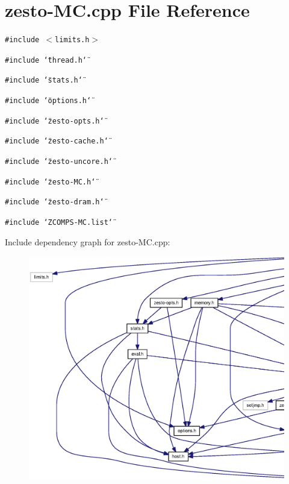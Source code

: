 \section{zesto-MC.cpp File Reference}
\label{zesto-MC_8cpp}
{\tt \#include $<$limits.h$>$}\par
{\tt \#include \char`\"{}thread.h\char`\"{}}\par
{\tt \#include \char`\"{}stats.h\char`\"{}}\par
{\tt \#include \char`\"{}options.h\char`\"{}}\par
{\tt \#include \char`\"{}zesto-opts.h\char`\"{}}\par
{\tt \#include \char`\"{}zesto-cache.h\char`\"{}}\par
{\tt \#include \char`\"{}zesto-uncore.h\char`\"{}}\par
{\tt \#include \char`\"{}zesto-MC.h\char`\"{}}\par
{\tt \#include \char`\"{}zesto-dram.h\char`\"{}}\par
{\tt \#include \char`\"{}ZCOMPS-MC.list\char`\"{}}\par


Include dependency graph for zesto-MC.cpp:\nopagebreak
\begin{figure}[H]
\begin{center}
\leavevmode
\includegraphics[width=420pt]{zesto-MC_8cpp__incl}
\end{center}
\end{figure}
